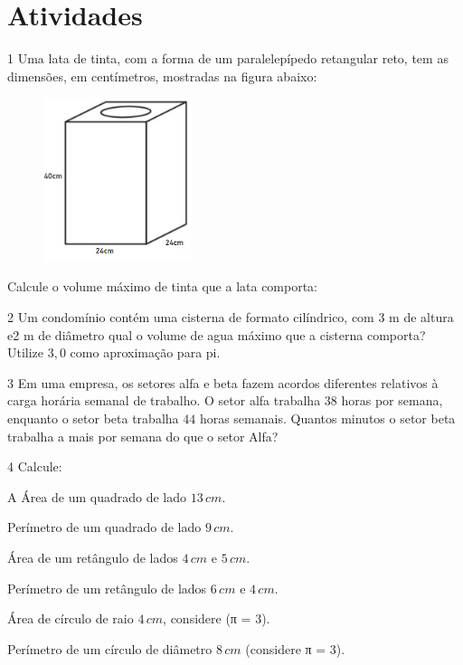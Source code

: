 \section{Atividades}

\num{1}  Uma lata de tinta, com a forma de um paralelepípedo retangular reto,
tem as dimensões, em centímetros, mostradas na figura abaixo:

\begin{figure}
\includegraphics[width=1.69792in,height=1.88115in]{./imgSAEB_6_MAT/media/image95.png}
\end{figure}

Calcule o volume máximo de tinta que a lata comporta:


\num{2}  Um condomínio contém uma cisterna de formato cilíndrico, com $3$ m de
altura e2 m de diâmetro qual o volume de agua máximo que a cisterna
comporta? Utilize $3,0$ como aproximação para pi.


\num{3}  Em uma empresa, os setores alfa e beta fazem acordos diferentes
relativos à carga horária semanal de trabalho. O setor alfa trabalha $38$
horas por semana, enquanto o setor beta trabalha $44$ horas semanais.
Quantos minutos o setor beta trabalha a mais por semana do que o setor
Alfa? 


\num{4} Calcule:

\begin{escolha}
\item A Área de um quadrado de lado $13\,cm$. 
\item Perímetro de um quadrado de lado $9\,cm$. 
\item Área de um retângulo de lados $4\,cm$ e $5\,cm$. 
\item Perímetro de um retângulo de lados $6\,cm$ e $4\,cm$. 
\item Área de círculo de raio $4\,cm$, considere (π = $3$). 
\item Perímetro de um círculo de diâmetro $8\,cm$ (considere π = $3$). 
\end{escolha}

